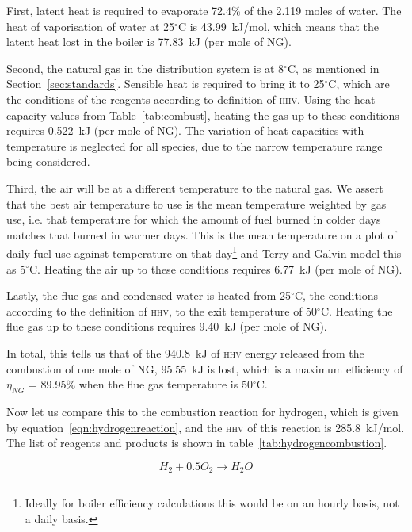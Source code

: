 \documentclass[5p]{elsarticle} %
\begin{document}
First, latent heat is required to evaporate 72.4\% of the 2.119 moles of water.
The heat of vaporisation of water at 25$^{\circ}$C is 43.99~kJ/mol, which means that the latent heat lost in the boiler is 77.83~kJ (per mole of NG).

Second, the natural gas in the distribution system is at 8$^{\circ}$C, as mentioned in Section~\ref{sec:standards}. 
Sensible heat is required to bring it to 25$^{\circ}$C, which are the conditions of the reagents according to definition of \textsc{hhv}.
Using the heat capacity values from Table~\ref{tab:combust}, heating the gas up to these conditions requires 0.522~kJ (per mole of NG).
The variation of heat capacities with temperature is neglected for all species, due to the narrow temperature range being considered.

Third, the air will be at a different temperature to the natural gas. 
We assert that the best air temperature to use is the mean temperature weighted by gas use, i.e. that temperature for which the amount of fuel burned in colder days matches that burned in warmer days. 
This is the mean temperature on a plot of daily fuel use against temperature on that day\footnote{Ideally for boiler efficiency calculations this would be on an hourly basis, not a daily basis.} and Terry and Galvin\citep{Terry2023} model this as 5$^\circ$C.
Heating the air up to these conditions requires 6.77~kJ (per mole of NG).

Lastly, the flue gas and condensed water is heated from 25$^\circ$C, the conditions according to the definition of \textsc{hhv}, to the exit temperature of 50$^{\circ}$C.
Heating the flue gas up to these conditions requires 9.40~kJ (per mole of NG).

In total, this tells us that of the 940.8~kJ of \textsc{hhv} energy released from the combustion of one mole of NG, 95.55~kJ is lost, which is a maximum efficiency of $\eta_{NG}$ = 89.95\% when the flue gas temperature is 50$^{\circ}$C.

Now let us compare this to the combustion reaction for hydrogen, which is given by equation~\eqref{eqn:hydrogenreaction}, and the \textsc{hhv} of this reaction is 285.8~kJ/mol.
The list of reagents and products is shown in table~\ref{tab:hydrogencombustion}.

\begin{equation}
    \label{eqn:hydrogenreaction}
    H_2 + 0.5 O_2 \longrightarrow H_2 O
\end{equation}
\end{document}
